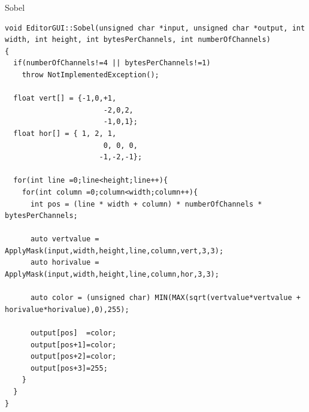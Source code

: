 \documentclass[a4paper]{sbgames}               %
\begin{document}
\pagebreak
Sobel
\begin{lstlisting}
void EditorGUI::Sobel(unsigned char *input, unsigned char *output, int width, int height, int bytesPerChannels, int numberOfChannels)
{
  if(numberOfChannels!=4 || bytesPerChannels!=1)
    throw NotImplementedException();

  float vert[] = {-1,0,+1,
                       -2,0,2,
                       -1,0,1};
  float hor[] = { 1, 2, 1,
                       0, 0, 0,
                      -1,-2,-1};

  for(int line =0;line<height;line++){
    for(int column =0;column<width;column++){
      int pos = (line * width + column) * numberOfChannels * bytesPerChannels;

      auto vertvalue = ApplyMask(input,width,height,line,column,vert,3,3);
      auto horivalue = ApplyMask(input,width,height,line,column,hor,3,3);

      auto color = (unsigned char) MIN(MAX(sqrt(vertvalue*vertvalue + horivalue*horivalue),0),255);

      output[pos]  =color;
      output[pos+1]=color;
      output[pos+2]=color;
      output[pos+3]=255;
    }
  }
}
\end{lstlisting}
\end{document}
